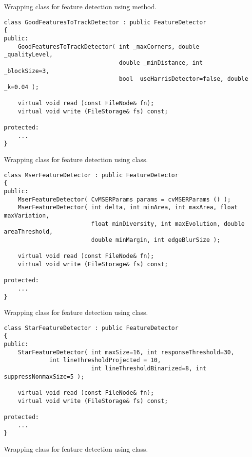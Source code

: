 Wrapping class for feature detection using  method.

\begin{lstlisting}
class GoodFeaturesToTrackDetector : public FeatureDetector
{
public:
    GoodFeaturesToTrackDetector( int _maxCorners, double _qualityLevel, 
                                 double _minDistance, int _blockSize=3,
                                 bool _useHarrisDetector=false, double _k=0.04 );
                                 
    virtual void read (const FileNode& fn);
    virtual void write (FileStorage& fs) const;
    
protected:
	...
}
\end{lstlisting}

Wrapping class for feature detection using  class.

\begin{lstlisting}
class MserFeatureDetector : public FeatureDetector
{
public:
    MserFeatureDetector( CvMSERParams params = cvMSERParams () );
    MserFeatureDetector( int delta, int minArea, int maxArea, float maxVariation,
                         float minDiversity, int maxEvolution, double areaThreshold,
                         double minMargin, int edgeBlurSize );
                         
    virtual void read (const FileNode& fn);
    virtual void write (FileStorage& fs) const;
    
protected:
	...
}
\end{lstlisting}

Wrapping class for feature detection using  class.

\begin{lstlisting}
class StarFeatureDetector : public FeatureDetector
{
public:
    StarFeatureDetector( int maxSize=16, int responseThreshold=30, 
			 int lineThresholdProjected = 10,
                         int lineThresholdBinarized=8, int suppressNonmaxSize=5 );
    
    virtual void read (const FileNode& fn);
    virtual void write (FileStorage& fs) const;
    
protected:
	...
}
\end{lstlisting}

Wrapping class for feature detection using  class.

